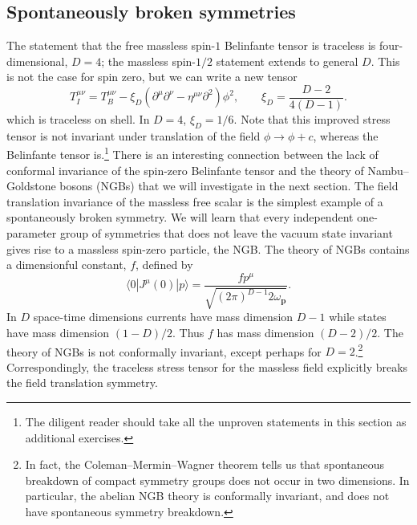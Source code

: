\subsection{Spontaneously broken symmetries}

The statement that the free massless spin-$1$ Belinfante tensor is traceless
is four-dimensional, $D=4$; the massless spin-$1/2$ statement extends to
general $D$. This is not the case for spin zero, but we can write a new tensor
\begin{equation*}
  T_I^{\mu\nu}=T_B^{\mu\nu}
  -\xi_D(\partial^\mu\partial^\nu-\eta^{\mu\nu}\partial^2)\phi^2,
  \qquad \xi_D=\frac{D-2}{4(D-1)}.
\end{equation*}
which is traceless on shell.  In $D=4$, $\xi_D=1/6$.  Note that this improved
stress tensor is not invariant under
translation of the field $\phi\to\phi+c$, whereas the Belinfante tensor is.\footnote[4]{The diligent reader should take all the unproven statements in this
section as additional exercises.} There is an interesting connection between
the lack of conformal invariance of the spin-zero Belinfante tensor and the
theory of Nambu--Goldstone bosons (NGBs) that we will investigate in the next
section. The field translation invariance of the massless free scalar is the
simplest example of a spontaneously broken symmetry. We will learn that every
independent one-parameter group of symmetries that does not leave the vacuum
state invariant gives rise to a massless spin-zero particle, the NGB. The theory
of NGBs contains a dimensionful constant, $f$, defined by
\begin{equation*}
  \langle0|J^\mu(0)|p\rangle
  =\frac{fp^\mu}{\sqrt{(2\pi)^{D-1}2\omega_{\mathbf p}}}.
\end{equation*}
In $D$ space-time dimensions currents have mass dimension $D-1$ while states
have mass dimension $(1-D)/2$. Thus $f$ has mass dimension $(D-2)/2$. The theory
of NGBs is not conformally invariant, except perhaps for $D=2$.\footnote[5]{In
fact, the Coleman--Mermin--Wagner theorem tells us that spontaneous breakdown
of compact symmetry groups does not occur in two dimensions. In particular, the
abelian NGB theory is conformally invariant, and does not have spontaneous
symmetry breakdown.} Correspondingly, the traceless stress tensor for the
massless field explicitly breaks the field translation symmetry.


